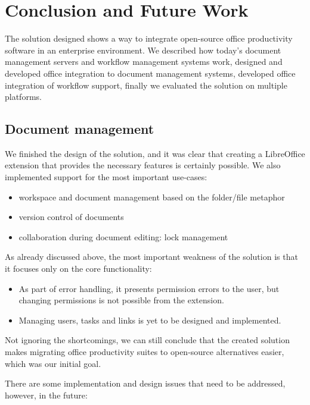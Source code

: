 \chapter{Conclusion and Future Work}

The solution designed shows a way to integrate open-source office productivity
software in an enterprise environment. We described how today's document
management servers and workflow management systems work, designed and
developed office integration to document management systems, developed
office integration of workflow support, finally we evaluated the solution on
multiple platforms.

\section{Document management}

We finished the design of the solution, and it was clear that creating a
LibreOffice extension that provides the necessary features is certainly
possible. We also implemented support for the most important use-cases:

\begin{itemize}
\item workspace and document management based on the folder/file metaphor
\item version control of documents
\item collaboration during document editing: lock management
\end{itemize}

As already discussed above, the most important weakness of the solution is that
it focuses only on the core functionality:

\begin{itemize}
\item As part of error handling, it presents permission errors to the user, but
changing permissions is not possible from the extension.
\item Managing users, tasks and links is yet to be designed and implemented.
\end{itemize}

Not ignoring the shortcomings, we can still conclude that the created solution
makes migrating office productivity suites to open-source alternatives easier,
which was our initial goal.

There are some implementation and design issues that need to be addressed,
however, in the future:

